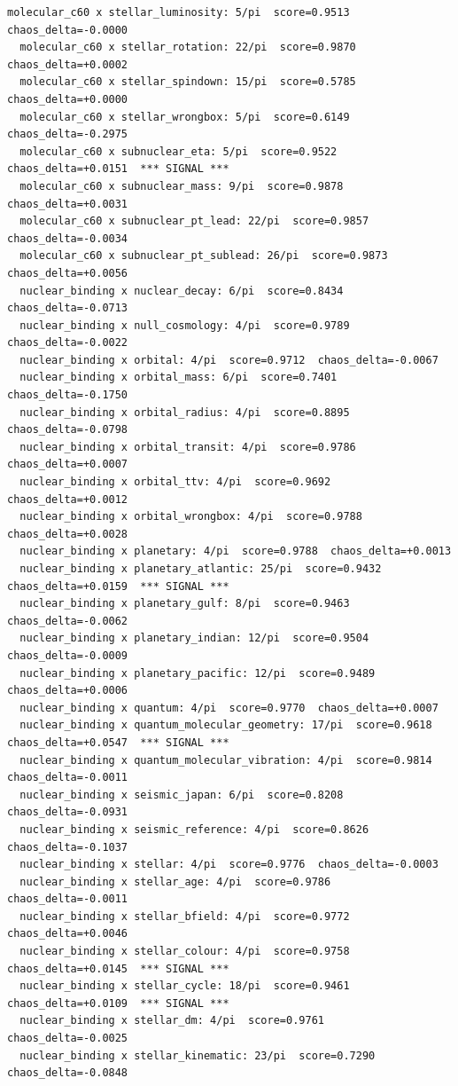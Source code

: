 \documentclass[11pt, letterpaper, openany]{book}
\begin{document}
\begin{empiricalbox}
\begin{lstlisting}[style=terminal]
  molecular_c60 x stellar_luminosity: 5/pi  score=0.9513  chaos_delta=-0.0000
  molecular_c60 x stellar_rotation: 22/pi  score=0.9870  chaos_delta=+0.0002
  molecular_c60 x stellar_spindown: 15/pi  score=0.5785  chaos_delta=+0.0000
  molecular_c60 x stellar_wrongbox: 5/pi  score=0.6149  chaos_delta=-0.2975
  molecular_c60 x subnuclear_eta: 5/pi  score=0.9522  chaos_delta=+0.0151  *** SIGNAL ***
  molecular_c60 x subnuclear_mass: 9/pi  score=0.9878  chaos_delta=+0.0031
  molecular_c60 x subnuclear_pt_lead: 22/pi  score=0.9857  chaos_delta=-0.0034
  molecular_c60 x subnuclear_pt_sublead: 26/pi  score=0.9873  chaos_delta=+0.0056
  nuclear_binding x nuclear_decay: 6/pi  score=0.8434  chaos_delta=-0.0713
  nuclear_binding x null_cosmology: 4/pi  score=0.9789  chaos_delta=-0.0022
  nuclear_binding x orbital: 4/pi  score=0.9712  chaos_delta=-0.0067
  nuclear_binding x orbital_mass: 6/pi  score=0.7401  chaos_delta=-0.1750
  nuclear_binding x orbital_radius: 4/pi  score=0.8895  chaos_delta=-0.0798
  nuclear_binding x orbital_transit: 4/pi  score=0.9786  chaos_delta=+0.0007
  nuclear_binding x orbital_ttv: 4/pi  score=0.9692  chaos_delta=+0.0012
  nuclear_binding x orbital_wrongbox: 4/pi  score=0.9788  chaos_delta=+0.0028
  nuclear_binding x planetary: 4/pi  score=0.9788  chaos_delta=+0.0013
  nuclear_binding x planetary_atlantic: 25/pi  score=0.9432  chaos_delta=+0.0159  *** SIGNAL ***
  nuclear_binding x planetary_gulf: 8/pi  score=0.9463  chaos_delta=-0.0062
  nuclear_binding x planetary_indian: 12/pi  score=0.9504  chaos_delta=-0.0009
  nuclear_binding x planetary_pacific: 12/pi  score=0.9489  chaos_delta=+0.0006
  nuclear_binding x quantum: 4/pi  score=0.9770  chaos_delta=+0.0007
  nuclear_binding x quantum_molecular_geometry: 17/pi  score=0.9618  chaos_delta=+0.0547  *** SIGNAL ***
  nuclear_binding x quantum_molecular_vibration: 4/pi  score=0.9814  chaos_delta=-0.0011
  nuclear_binding x seismic_japan: 6/pi  score=0.8208  chaos_delta=-0.0931
  nuclear_binding x seismic_reference: 4/pi  score=0.8626  chaos_delta=-0.1037
  nuclear_binding x stellar: 4/pi  score=0.9776  chaos_delta=-0.0003
  nuclear_binding x stellar_age: 4/pi  score=0.9786  chaos_delta=-0.0011
  nuclear_binding x stellar_bfield: 4/pi  score=0.9772  chaos_delta=+0.0046
  nuclear_binding x stellar_colour: 4/pi  score=0.9758  chaos_delta=+0.0145  *** SIGNAL ***
  nuclear_binding x stellar_cycle: 18/pi  score=0.9461  chaos_delta=+0.0109  *** SIGNAL ***
  nuclear_binding x stellar_dm: 4/pi  score=0.9761  chaos_delta=-0.0025
  nuclear_binding x stellar_kinematic: 23/pi  score=0.7290  chaos_delta=-0.0848

\end{lstlisting}
\end{empiricalbox}
\end{document}
